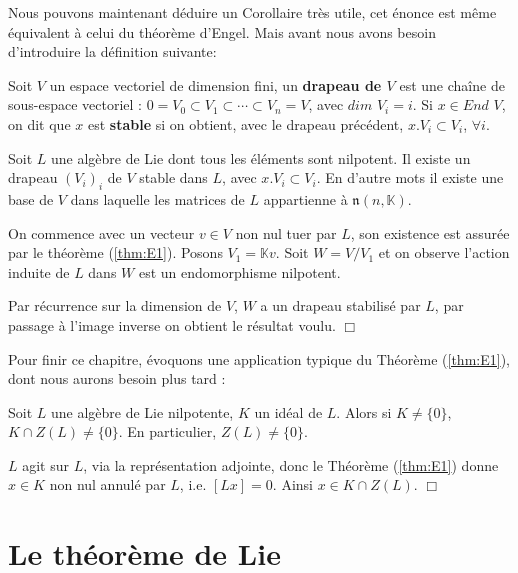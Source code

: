 \documentclass[a4paper,openany,12pt]{report}
\newcommand{\KK}{\mathbb{K}}
\newcommand{\nn}{\mathfrak{n}}
\theoremstyle{break}
{\theorembodyfont{\upshape}
\newtheorem*{rmq}{Remarque :}
\newtheorem*{prv}{Preuve :}
\newtheorem*{ex}{Exemples :}
\newtheorem{exe}{Exemple : }
\newtheorem*{nota}{Notation :}}
\begin{document}
Nous pouvons maintenant déduire un Corollaire très utile, cet énonce est même équivalent à celui du théorème d'Engel. Mais avant nous avons besoin d'introduire la définition suivante:

\begin{df}
\quad Soit $V$ un espace vectoriel de dimension fini, un \textbf{drapeau de $V$} est une chaîne de sous-espace vectoriel : $0 = V_{0} \subset V_{1} \subset \cdots \subset V_{n} = V$, avec $dim$ $V_{i} = i$.
Si $x \in End$ $V$, on dit que $x$ est \textbf{stable} si on obtient, avec le drapeau précédent, $x.V_{i} \subset V_{i}$, $\forall i$.
\end{df}

\begin{cor}\label{cor:E1}
\quad Soit $L$ une algèbre de Lie dont tous les éléments sont nilpotent. Il existe un drapeau $(V_{i})_{i}$ de $V$ stable dans $L$, avec $x.V_{i} \subset V_{i}$. En d'autre mots il existe une base de $V$ dans laquelle les matrices de $L$ appartienne à $\nn(n,\KK)$.
\end{cor}

\begin{prv}
\quad On commence avec un vecteur $v \in V$ non nul tuer par $L$, son existence est assurée par le théorème (\ref{thm:E1}). Posons $V_{1} = \KK v$. Soit $W= V/V_{1}$ et on observe l'action induite de $L$ dans $W$ est un endomorphisme nilpotent.

Par récurrence sur la dimension de $V$, $W$ a un drapeau stabilisé par $L$, par passage à l'image inverse on obtient le résultat voulu. $\Box$
\end{prv}

Pour finir ce chapitre, évoquons une application  typique du Théorème (\ref{thm:E1}), dont nous aurons besoin plus tard : 

\begin{lem}\label{lem:E2}
\quad Soit $L$ une algèbre de Lie nilpotente, $K$ un idéal de $L$. Alors si $K \neq \{0\}$, $K \cap Z(L) \neq \{ 0 \}$.
En particulier, $Z(L) \neq \{ 0 \}$.
\end{lem}

\begin{prv}
\quad $L$ agit sur $L$, via la représentation adjointe, donc le Théorème (\ref{thm:E1}) donne $x \in K$ non nul annulé par $L$, i.e. $[Lx]=0$. Ainsi $x \in K \cap Z(L)$. $\Box$
\end{prv}

\chapter{Le théorème de Lie}
\end{document}
